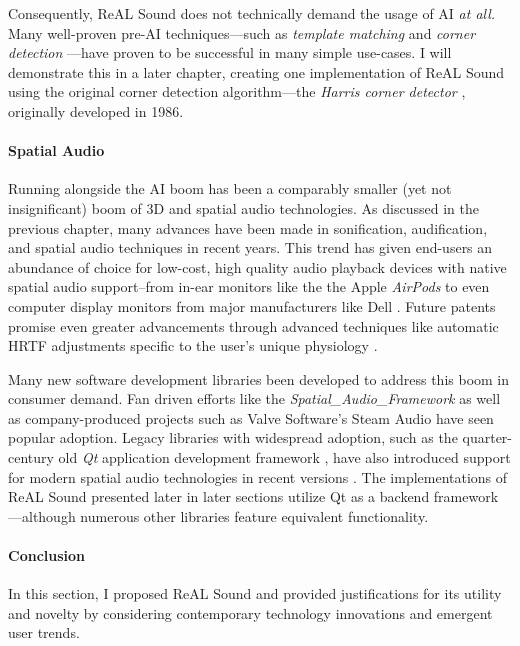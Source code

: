 \documentclass{report}
\newcommand{\rs}{ReAL Sound\xspace}
\begin{document}
Consequently, \rs does not technically demand the usage of AI \emph{at all.} Many well-proven pre-AI techniques---such as \emph{template matching} \cite{Brunelli2009-gh} and \emph{corner detection} \cite{Hildreth1980}---have proven to be successful in many simple use-cases. I will demonstrate this in a later chapter, creating one  implementation of \rs using the original corner detection algorithm---the \emph{Harris corner detector} \cite{Harris}, originally developed in 1986. 

\paragraph{Spatial Audio}
Running alongside the AI boom has been a comparably smaller (yet not insignificant) boom of 3D and spatial audio technologies. As discussed in the previous chapter, many advances have been made in sonification, audification, and spatial audio techniques in recent years. This trend has given end-users an abundance of choice for low-cost, high quality audio playback devices with native spatial audio support--from in-ear monitors like the the Apple \emph{AirPods} \cite{ApplePods} to even computer display monitors from major manufacturers like Dell \cite{Campbell_2025}. Future patents promise even greater advancements through advanced techniques like automatic HRTF adjustments specific to the user's unique physiology \cite{Antti2024}.


Many new software development libraries been developed to address this boom in consumer demand. Fan driven efforts like the \emph{Spatial\_Audio\_Framework} \cite{McCormack2024} as well as company-produced projects such as Valve Software's Steam Audio \cite{Valve} have seen popular adoption. Legacy libraries with widespread adoption, such as the quarter-century old \emph{Qt} application development framework \cite{QTProgramming}, have also introduced support for modern spatial audio technologies in recent versions \cite{QTSpatial}. The implementations of \rs presented later in later sections utilize Qt as a backend framework---although numerous other libraries feature equivalent functionality. 

\paragraph{Conclusion}
In this section, I proposed \rs and provided justifications for its utility and novelty by considering contemporary technology innovations and emergent user trends. 
\end{document}
